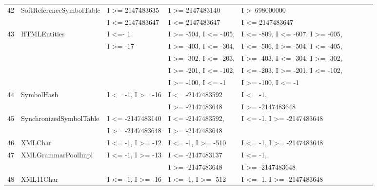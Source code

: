 \begin{table}[h]
{{\begin{tabular}{|l|l|l|l|l|l|l|l|l|}
42	& SoftReferenceSymbolTable	& I \textgreater= 2147483635				& I \textgreater= 2147483140			& I \textgreater~698000000					\\ 
	&                                             & I \textless= 2147483647					& I \textless= 2147483647				&  I \textless= 2147483647					\\
43	& HTMLEntities				& I \textless=- 1								& I \textgreater= -504, I \textless= -405,	&  I \textless= -809, I \textless= -607, I \textgreater= -605,    		\\ 
	&                         			& I \textgreater= -17							& I \textgreater= -403, I \textless= -304, 	&  I \textless= -506, I \textgreater= -504, I \textless= -405,		 \\	
	&                         			& 											& I \textgreater= -302, I \textless= -203,	&  I \textgreater= -403, I \textless= -304, I \textgreater= -302,		 \\	
	&                        				& 											& I \textgreater= -201, I \textless= -102, 	&  I \textless= -203, I \textgreater= -201, I \textless= -102,		 \\	
	&                         			& 											& I \textgreater= -100, I \textless= -1		&  I \textgreater= -100, I \textless= -1				 			 \\	
44	& SymbolHash				& I \textless= -1,  I \textgreater= -16			& I \textless= -2147483592			 	& I \textless= -1, 							\\ 
	&							&											& I \textgreater= -2147483648			& I \textgreater= -2147483648				\\
45	& SynchronizedSymbolTable	& I \textless= -2147483140					& I \textless= -2147483592,				& I \textless= -1, I \textgreater= -2147483648	\\ 
	&                                             & I \textgreater= -2147483648				& I \textgreater= -2147483648 			&  			   								\\
46	& XMLChar					& I \textless= -1, I \textgreater= -12			& I \textless= -1, I \textgreater= -510		& I \textless= -1, I \textgreater= -2147483648	\\
47	& XMLGrammarPoolImpl		& I \textless= -1, I \textgreater= -13			& I \textless= -2147483137 				& I \textless= -1, 							\\ 
	&							&											& I \textgreater= -2147483648			& I \textgreater= -2147483648				\\
48	& XML11Char				& I \textless= -1, I \textgreater= -16			& I \textless= -1, I \textgreater= -512		& I \textless= -1, I \textgreater= -2147483648	\\ 

\end{tabular}}}
\end{table}
